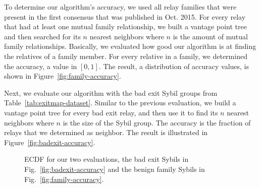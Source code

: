 To determine our algorithm's accuracy, we used all relay families that were
present in the first consensus that was published in Oct. 2015.  For every relay
that had at least one mutual family relationship, we built a vantage point tree and then
searched for its $n$ nearest neighbors where $n$ is the amount of mutual family
relationships.  Basically, we evaluated how good our algorithm is at finding the
relatives of a family member.  For every relative in a family, we determined the
accuracy, a value in $[0,1]$.  The result, a distribution of accuracy values, is
shown in Figure~\ref{fig:family-accuracy}.

Next, we evaluate our algorithm with the bad exit Sybil groups from
Table~\ref{tab:exitmap-dataset}.  Similar to the previous evaluation, we build a
vantage point tree for every bad exit relay, and then use it to find its $n$
nearest neighbors where $n$ is the size of the Sybil group.  The accuracy is the
fraction of relays that we determined as neighbor.  The result is illustrated
in Figure~\ref{fig:badexit-accuracy}.

\begin{figure}
\centering
{}
\caption{ECDF for our two evaluations, the bad exit Sybils
	in Fig.~\ref{fig:badexit-accuracy} and the benign family Sybils
	in Fig.~\ref{fig:family-accuracy}.}
\label{fig:accuracy}
\end{figure}

